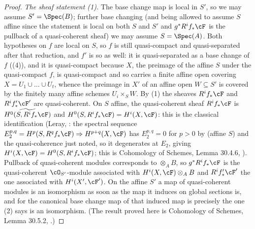 \begin{proof}
\emph{The sheaf statement (1).}  The base change map is local in $S'$,
so we may assume $S'=\Spec(B)$; further base changing (and being
allowed to assume $S$ affine since the statement is local on both $S$
and $S'$ and $g^*R^if_*\cF$ is the pullback of a quasi-coherent
sheaf) we may assume $S=\Spec(A)$.  Both hypotheses on $f$ are local on
$S$, so $f$ is still quasi-compact and quasi-separated after that
reduction, and $f'$ is so as well: it is quasi-separated as a base
change of $f$ ((4)), and it is
quasi-compact because $X$, the preimage of the affine $S$ under the
quasi-compact $f$, is quasi-compact and so carries a finite affine open
covering $X=U_1\cup\dots\cup U_t$, whence the preimage in $X'$ of an
affine open $W\subseteq S'$ is covered by the finitely many affine
schemes $U_i\times_SW$.  By
(1) the sheaves $R^if_*\cF$ and
$R^if'_*\cF'$ are quasi-coherent.  On $S$ affine, the quasi-coherent
sheaf $R^if_*\cF$ is $\widetilde{H^0(S,R^if_*\cF)}$ and
$H^0(S,R^if_*\cF)=H^i(X,\cF)$: this is the classical identification
(Leray, : the spectral sequence
$E_2^{p,q}=H^p(S,R^qf_*\cF)\Rightarrow H^{p+q}(X,\cF)$ has
$E_2^{p,q}=0$ for $p>0$ by  (affine $S$)
and the quasi-coherence just noted, so it degenerates at $E_2$, giving
$H^i(X,\cF)=H^0(S,R^if_*\cF)$; this is Cohomology of Schemes,
Lemma 30.4.6, ).
Pullback of quasi-coherent modules corresponds to $\otimes_AB$, so
$g^*R^if_*\cF$ is the quasi-coherent $\cO_{S'}$-module associated with
$H^i(X,\cF)\otimes_AB$ and $R^if'_*\cF'$ the one associated with
$H^i(X',\cF')$.  On the affine $S'$ a map of quasi-coherent modules is
an isomorphism as soon as the map it induces on global sections is, and
for the canonical base change map of  that
induced map is precisely the one (2) says is an isomorphism.  (The
result proved here is Cohomology of Schemes, Lemma 30.5.2,
.)
\end{proof}


